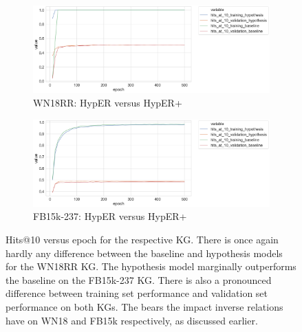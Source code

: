 
\begin{figure}[H]
	\begin{subfigure}[b]{.5\linewidth}
   		\centering
    		\includegraphics[width=1.0\linewidth, height=0.6\linewidth]{WN18RR_hits_at_10_Results}
		\captionsetup{justification=centering}
		\caption{WN18RR: HypER versus HypER+}
	\end{subfigure}
	\begin{subfigure}[b]{.5\linewidth}
   		\centering
		\includegraphics[width=1.0\linewidth, height=0.6\linewidth]{FB15k-237_hits_at_10_Results}
		\captionsetup{justification=centering}
		\caption{FB15k-237: HypER versus HypER+}
	\end{subfigure}
	\captionsetup{justification=centering}
	\caption{Hits@10 versus epoch for the respective KG. There is once again hardly any difference between the baseline and hypothesis models for the WN18RR KG. The hypothesis model marginally outperforms the baseline on the FB15k-237 KG. There is also a pronounced difference between training set performance and validation set performance on both KGs. The bears the impact inverse relations have on WN18 and FB15k respectively, as discussed earlier.}
\end{figure}


